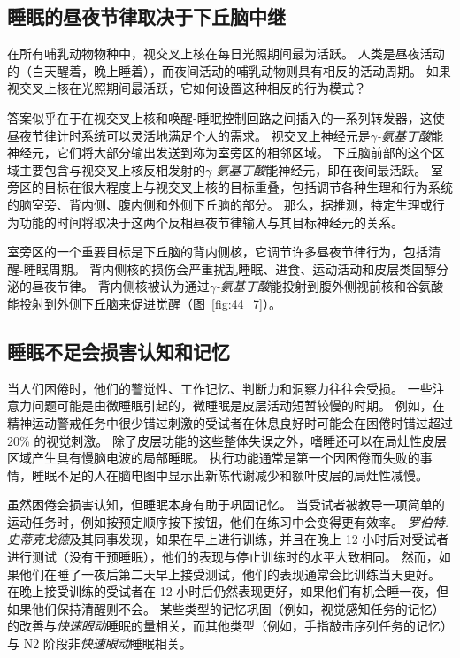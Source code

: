 \subsection{睡眠的昼夜节律取决于下丘脑中继}

在所有哺乳动物物种中，视交叉上核在每日光照期间最为活跃。
人类是昼夜活动的（白天醒着，晚上睡着），而夜间活动的哺乳动物则具有相反的活动周期。
如果视交叉上核在光照期间最活跃，它如何设置这种相反的行为模式？


答案似乎在于在视交叉上核和唤醒-睡眠控制回路之间插入的一系列转发器，这使昼夜节律计时系统可以灵活地满足个人的需求。
视交叉上神经元是\textit{$\gamma$-氨基丁酸}能神经元，它们将大部分输出发送到称为室旁区的相邻区域。
下丘脑前部的这个区域主要包含与视交叉上核反相发射的\textit{$\gamma$-氨基丁酸}能神经元，即在夜间最活跃。
室旁区的目标在很大程度上与视交叉上核的目标重叠，包括调节各种生理和行为系统的脑室旁、背内侧、腹内侧和外侧下丘脑的部分。
那么，据推测，特定生理或行为功能的时间将取决于这两个反相昼夜节律输入与其目标神经元的关系。


室旁区的一个重要目标是下丘脑的背内侧核，它调节许多昼夜节律行为，包括清醒-睡眠周期。
背内侧核的损伤会严重扰乱睡眠、进食、运动活动和皮层类固醇分泌的昼夜节律。
背内侧核被认为通过\textit{$\gamma$-氨基丁酸}能投射到腹外侧视前核和谷氨酸能投射到外侧下丘脑来促进觉醒（图~\ref{fig:44_7}）。



\subsection{睡眠不足会损害认知和记忆}

当人们困倦时，他们的警觉性、工作记忆、判断力和洞察力往往会受损。
一些注意力问题可能是由微睡眠引起的，微睡眠是皮层活动短暂较慢的时期。
例如，在精神运动警戒任务中很少错过刺激的受试者在休息良好时可能会在困倦时错过超过 20\% 的视觉刺激。
除了皮层功能的这些整体失误之外，嗜睡还可以在局灶性皮层区域产生具有慢脑电波的局部睡眠。
执行功能通常是第一个因困倦而失败的事情，睡眠不足的人在脑电图中显示出新陈代谢减少和额叶皮层的局灶性减慢。


虽然困倦会损害认知，但睡眠本身有助于巩固记忆。
当受试者被教导一项简单的运动任务时，例如按预定顺序按下按钮，他们在练习中会变得更有效率。
\textit{罗伯特.史蒂克戈德}及其同事发现，如果在早上进行训练，并且在晚上 12 小时后对受试者进行测试（没有干预睡眠），他们的表现与停止训练时的水平大致相同。
然而，如果他们在睡了一夜后第二天早上接受测试，他们的表现通常会比训练当天更好。
在晚上接受训练的受试者在 12 小时后仍然表现更好，如果他们有机会睡一夜，但如果他们保持清醒则不会。
某些类型的记忆巩固（例如，视觉感知任务的记忆）的改善与\textit{快速眼动}睡眠的量相关，而其他类型（例如，手指敲击序列任务的记忆）与 N2 阶段非\textit{快速眼动}睡眠相关。


